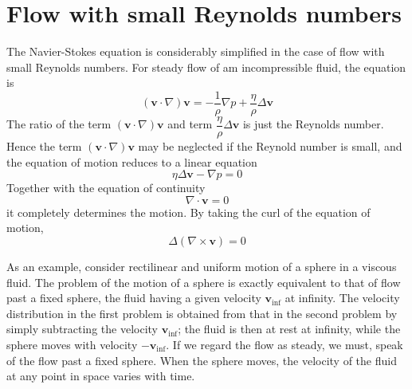 \documentclass[conference]{IEEEtran}
\theoremstyle{definition}
\theoremstyle{remark}
\begin{document}
    \section{Flow with small Reynolds numbers}
    The Navier-Stokes equation is considerably simplified in the case of flow with small Reynolds numbers. For steady flow of am incompressible fluid, the equation is
    \begin{equation*}
        (\mathbf{v} \cdot \nabla) \mathbf{v} = -\dfrac1\rho \nabla p + \dfrac{\eta}{\rho} \Delta \mathbf{v}
    \end{equation*}
    The ratio of the term $(\mathbf{v} \cdot \nabla) \mathbf{v}$ and term $\dfrac{\eta}{\rho} \Delta \mathbf{v}$ is just the Reynolds number. Hence the term $(\mathbf{v} \cdot \nabla) \mathbf{v}$ may be neglected if the Reynold number is small, and the equation of motion reduces to a linear equation
    \begin{equation}
        \eta \Delta \mathbf{v} - \nabla p = 0
    \end{equation}
    Together with the equation of continuity
    \begin{equation}
        \nabla \cdot \mathbf{v} = 0
    \end{equation}
    it completely determines the motion. By taking the curl of the equation of motion,
    \begin{equation}
        \Delta (\nabla \times \mathbf{v}) = 0
        \label{eq:curl_of_equation_of_stokes_flow}
    \end{equation}

    As an example, consider rectilinear and uniform motion of a sphere in a viscous fluid. The problem of the motion of a sphere is exactly equivalent to that of flow past a fixed sphere, the fluid having a given velocity $\mathbf{v}_{\mathrm{inf}}$ at infinity. The velocity distribution in the first problem is obtained from that in the second problem by simply subtracting the velocity $\mathbf{v}_{\mathrm{inf}}$; the fluid is then at rest at infinity, while the sphere moves with velocity $-\mathbf{v}_{\mathrm{inf}}$. If we regard the flow as steady, we must, speak of the flow past a fixed sphere. When the sphere moves, the velocity of the fluid at any point in space varies with time.
\end{document}
